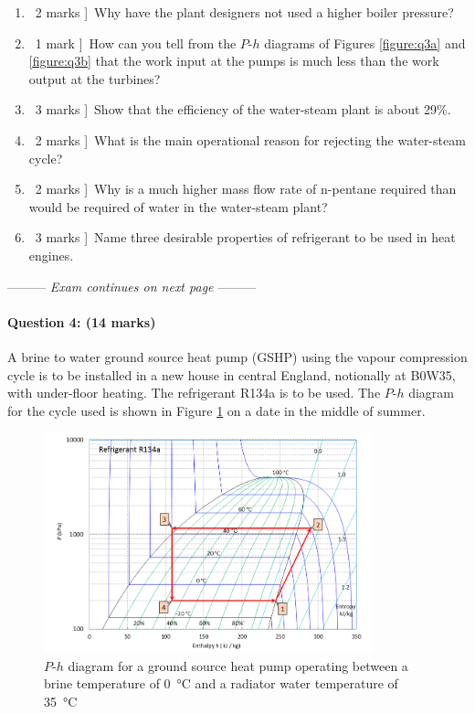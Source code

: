 \documentclass[a4paper,12pt,fleqn]{article}
\newcommand{\middlewords}{Exam continues on next page}
\begin{document}
\begin{enumerate}[label=\alph*)]
\item \lbrack\ 2 marks ]\ Why have the plant designers not used a higher boiler pressure?
\item \lbrack\ 1 mark ]\ How can you tell from the $P$-$h$ diagrams of Figures \ref{figure:q3a} and \ref{figure:q3b} that the work input at the pumps is much less than the work output at the turbines?
\item \lbrack\ 3 marks ]\ Show that the efficiency of the water-steam plant is about 29\%.
\item \lbrack\ 2 marks ]\ What is the main operational reason for rejecting the water-steam cycle?
\item \lbrack\ 2 marks ]\ Why is a much higher mass flow rate of n-pentane required than would be required of water in the water-steam plant?
\item \lbrack\ 3 marks ]\  Name three desirable properties of refrigerant to be used in heat engines.

\end{enumerate}


\begin{center}
\vspace{3cm}
--------- \textit{\middlewords} ---------
\end{center}
\newpage

\paragraph{\textbf{Question 4: (14 marks)}}


A brine to water ground source heat pump (GSHP) using the vapour compression cycle is to be installed in a new house in central England, notionally at B0W35, with under-floor heating. The refrigerant R134a is to be used. The $P$-$h$ diagram for the cycle used is shown in Figure \ref{figure:q4a} on a date in the middle of summer.
\begin{figure}[h]
\centering
\includegraphics[width=0.85\textwidth]{./figures/B0W35}
\caption{$P$-$h$ diagram for a ground source heat pump operating between a brine temperature of \SI{0}{\celsius} and a radiator water temperature of \SI{35}{\celsius}}
\label{figure:q4a}
\end{figure}
\end{document}
